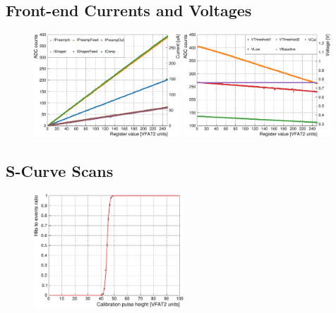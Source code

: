     \subsection{Front-end Currents and Voltages}

      \begin{figure}[h!]
        \centering
        \includegraphics[width=0.49\textwidth]{img/plots/cADC_Current-crop}
        \includegraphics[width=0.49\textwidth]{img/plots/cADC_Voltage-crop}
        \caption{}
        \label{fig:II-5-qualification-adc}
      \end{figure}

    \subsection{S-Curve Scans}

      \begin{figure}[h!]
        \centering
        \includegraphics[width=0.5\textwidth]{img/plots/cSCurve_T25-crop}
        \caption{}
        \label{fig:II-5-qualification-scurve}
      \end{figure}

